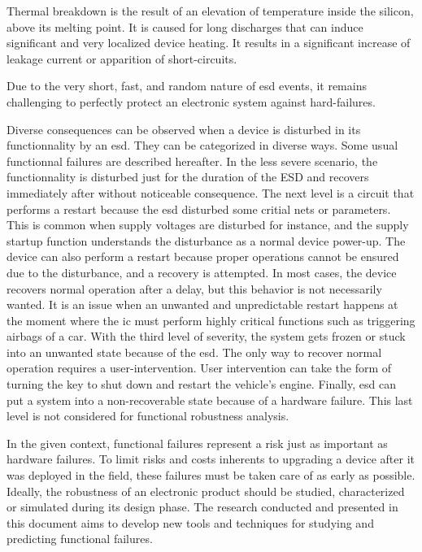 Thermal breakdown is the result of an elevation of temperature inside the silicon, above its melting point.
It is caused for long discharges that can induce significant and very localized device heating.
It results in a significant increase of leakage current or apparition of short-circuits.

Due to the very short, fast, and random nature of \gls{esd} events, it remains challenging to perfectly protect an electronic system against hard-failures.

Diverse consequences can be observed when a device is disturbed in its functionnality by an \gls{esd}.
They can be categorized in diverse ways.
Some usual functionnal failures are described hereafter.
In the less severe scenario, the functionnality is disturbed just for the duration of the ESD and recovers immediately after without noticeable consequence.
The next level is a circuit that performs a restart because the \gls{esd} disturbed some critial nets or parameters.
This is common when supply voltages are disturbed for instance, and the supply startup function understands the disturbance as a normal device power-up.
The device can also perform a restart because proper operations cannot be ensured due to the disturbance, and a recovery is attempted.
In most cases, the device recovers normal operation after a delay, but this behavior is not necessarily wanted.
It is an issue when an unwanted and unpredictable restart happens at the moment where the \gls{ic} must perform highly critical functions such as triggering airbags of a car.
With the third level of severity, the system gets frozen or stuck into an unwanted state because of the \gls{esd}.
The only way to recover normal operation requires a user-intervention.
User intervention can take the form of turning the key to shut down and restart the vehicle's engine.
Finally, \gls{esd} can put a system into a non-recoverable state because of a hardware failure.
This last level is not considered for functional robustness analysis.

In the given context, functional failures represent a risk just as important as hardware failures.
To limit risks and costs inherents to upgrading a device after it was deployed in the field, these failures must be taken care of as early as possible.
Ideally, the robustness of an electronic product should be studied, characterized or simulated during its design phase.
The research conducted and presented in this document aims to develop new tools and techniques for studying and predicting functional failures.

